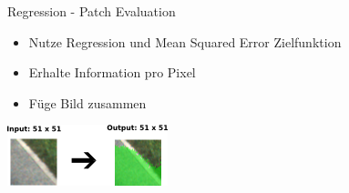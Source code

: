 \begin{frame}{Regression - Patch Evaluation}
\begin{minipage}{0.59\textwidth}
\begin{itemize}
\item Nutze Regression und Mean Squared Error Zielfunktion \\
\item Erhalte Information pro Pixel
\item Füge Bild zusammen \\
\end{itemize}
\end{minipage}
\begin{minipage}{0.39\textwidth}
	\flushright
      \includegraphics[]{../images/models/fully-conv.png}
\end{minipage}


\end{frame}

